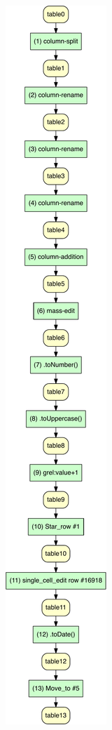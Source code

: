 \documentclass[conference]{ijdc-v14}
\begin{document}
\begin{figure}[t]
  \centering
{\includegraphics[height=0.33\textheight]{idcc2021/figures/table_view-crop.pdf}}
\hfill
{}

\end{figure}
\end{document}
